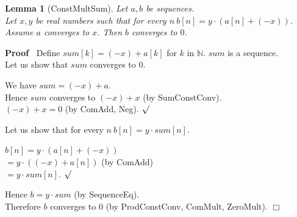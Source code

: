 \documentclass{article}
\newenvironment{forthel}{\begin{leftbar}}{\end{leftbar}}
\newenvironment{proof}{\noindent\textbf{Proof\ }}{\hspace*{\fill}$\Box$\medskip}
\newenvironment{subproof}{\begin{list}{}{}
		\item[\text{Proof}]}{\hfill $\surd$ \end{list}}
\newtheorem{lemma}{Lemma}
\newcommand{\NN}{\mathbb{N}}
\newcommand{\cdottwo}{\cdot}
\newcommand{\plustwo}{+}
\newcommand{\dotequal}{=}
\begin{document}
\begin{forthel}
	\begin{lemma}[ConstMultSum]
	Let $a,b$ be sequences. \\Let $x,y$ be real numbers such that for every $n\ b[n] = y \cdot (a[n] + (-x))$. \\Assume $a$ converges to $x$.
	Then $b$ converges to $0$.
	\end{lemma}
	\begin{proof}
	Define $sum[k] = (-x) + a[k]$ for $k$ in $\NN$.
	$sum$ is a sequence.
	\\Let us show that $sum$ converges to $0$.
	\begin{subproof}
	We have $sum = (-x) \plustwo a$.
	\\Hence $sum$ converges to $(-x) + x$ (by SumConstConv).
	\\$(-x) + x = 0$ (by ComAdd, Neg).
	\end{subproof}
	Let us show that for every $n\ b[n] = y \cdot sum[n]$.
	\begin{subproof}
	$b[n] \dotequal y \cdot (a[n] + (-x))$
	\\$\dotequal y \cdot ((-x) + a[n])$ (by ComAdd)
	\\$\dotequal y \cdot sum[n]$.
	\end{subproof}
	Hence $b = y \cdottwo sum$ (by SequenceEq).
	\\Therefore $b$ converges to $0$ (by ProdConstConv, ComMult, ZeroMult).
	\end{proof}
	

\end{forthel}
\end{document}
